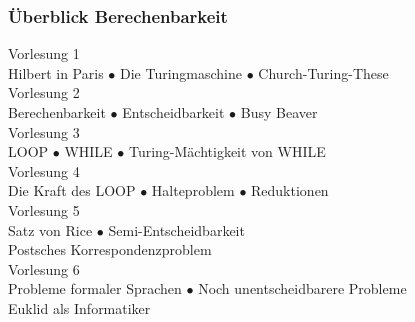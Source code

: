\documentclass[aspectratio=1610,onlymath]{beamer}
\begin{document}
\maketitle


\begin{frame}\frametitle{Überblick Berechenbarkeit}

\begin{center}
\alert{Vorlesung 1}\\
Hilbert in Paris $\bullet$ Die Turingmaschine $\bullet$ Church-Turing-These\\[1ex]
\alert{Vorlesung 2}\\
Berechenbarkeit $\bullet$ Entscheidbarkeit $\bullet$ Busy Beaver \\[1ex]
\alert{Vorlesung 3}\\LOOP $\bullet$ WHILE $\bullet$ Turing-Mächtigkeit von WHILE \\[1ex]
\alert{Vorlesung 4}\\Die Kraft des LOOP $\bullet$ Halteproblem $\bullet$ Reduktionen \\[1ex]
\alert{Vorlesung 5}\\Satz von Rice $\bullet$ Semi-Entscheidbarkeit\\ Postsches Korrespondenzproblem \\[1ex]
\alert{Vorlesung 6}\\Probleme formaler Sprachen $\bullet$ Noch unentscheidbarere Probleme\\ Euklid als Informatiker
\end{center}

\end{frame}
\end{document}
